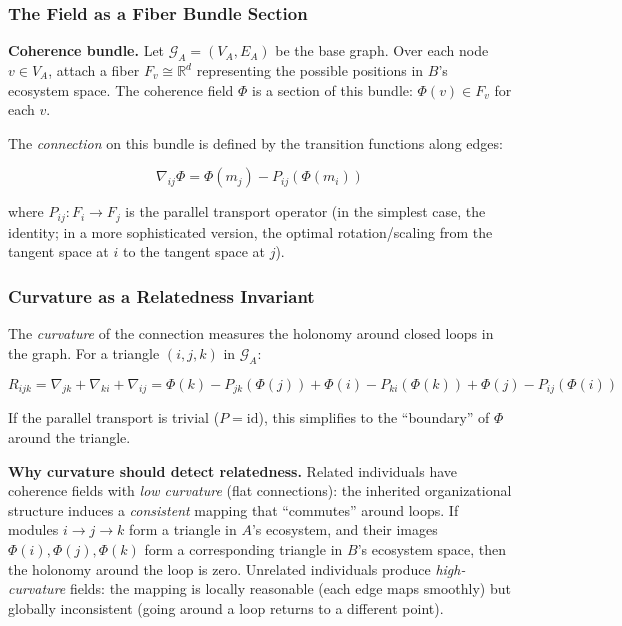 \documentclass{../yalumba}
\begin{document}
\subsubsection{The Field as a Fiber Bundle Section}

\begin{definition}
\textbf{Coherence bundle.}  Let $\mathcal{G}_A = (V_A, E_A)$ be the
base graph.  Over each node $v \in V_A$, attach a fiber
$F_v \cong \mathbb{R}^d$ representing the possible positions in $B$'s
ecosystem space.  The coherence field $\Phi$ is a section of this
bundle: $\Phi(v) \in F_v$ for each $v$.
\end{definition}

The \emph{connection} on this bundle is defined by the transition
functions along edges:

\begin{equation}
  \nabla_{ij} \Phi = \Phi(m_j) - P_{ij}(\Phi(m_i))
  \label{eq:connection}
\end{equation}

where $P_{ij}: F_i \to F_j$ is the parallel transport operator (in
the simplest case, the identity; in a more sophisticated version,
the optimal rotation/scaling from the tangent space at $i$ to the
tangent space at $j$).

\subsubsection{Curvature as a Relatedness Invariant}

The \emph{curvature} of the connection measures the holonomy around
closed loops in the graph.  For a triangle $(i, j, k)$ in
$\mathcal{G}_A$:

\begin{equation}
  R_{ijk} = \nabla_{jk} + \nabla_{ki} + \nabla_{ij}
  = \Phi(k) - P_{jk}(\Phi(j)) + \Phi(i) - P_{ki}(\Phi(k))
    + \Phi(j) - P_{ij}(\Phi(i))
  \label{eq:curvature}
\end{equation}

If the parallel transport is trivial ($P = \mathrm{id}$), this simplifies
to the ``boundary'' of $\Phi$ around the triangle.

\begin{keyfinding}
\textbf{Why curvature should detect relatedness.}  Related individuals
have coherence fields with \emph{low curvature} (flat connections):
the inherited organizational structure induces a \emph{consistent}
mapping that ``commutes'' around loops.  If modules $i \to j \to k$ form
a triangle in $A$'s ecosystem, and their images $\Phi(i), \Phi(j),
\Phi(k)$ form a corresponding triangle in $B$'s ecosystem space, then
the holonomy around the loop is zero.  Unrelated individuals produce
\emph{high-curvature} fields: the mapping is locally reasonable
(each edge maps smoothly) but globally inconsistent (going around
a loop returns to a different point).
\end{keyfinding}
\end{document}
